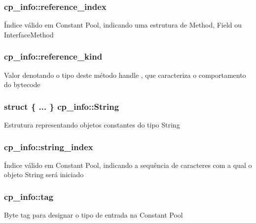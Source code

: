 \subsubsection[{\texorpdfstring{reference\+\_\+index}{reference_index}}]{ cp\+\_\+info\+::reference\+\_\+index}\hypertarget{structcp__info_a946bbab9aa280d4e22194ef7b434166a}{}\label{structcp__info_a946bbab9aa280d4e22194ef7b434166a}
Índice válido em Constant Pool, indicando uma estrutura de Method, Field ou Interface\+Method 
\subsubsection[{\texorpdfstring{reference\+\_\+kind}{reference_kind}}]{ cp\+\_\+info\+::reference\+\_\+kind}\hypertarget{structcp__info_a13e5aa07b7aa482061b89f4d7379a2dd}{}\label{structcp__info_a13e5aa07b7aa482061b89f4d7379a2dd}
Valor denotando o tipo deste método handle , que caracteriza o comportamento do bytecode 
\subsubsection[{\texorpdfstring{String}{String}}]{\setlength{\rightskip}{0pt plus 5cm}struct \{ ... \}   cp\+\_\+info\+::\+String}\hypertarget{structcp__info_a0b6107f2f01ff36a3d7d05175675b043}{}\label{structcp__info_a0b6107f2f01ff36a3d7d05175675b043}
Estrutura representando objetos constantes do tipo String 
\subsubsection[{\texorpdfstring{string\+\_\+index}{string_index}}]{ cp\+\_\+info\+::string\+\_\+index}\hypertarget{structcp__info_ae760e12a2ee01b0ace3d35170ca07981}{}\label{structcp__info_ae760e12a2ee01b0ace3d35170ca07981}
Índice válido em Constant Pool, indicando a sequência de caracteres com a qual o objeto String será iniciado 
\subsubsection[{\texorpdfstring{tag}{tag}}]{ cp\+\_\+info\+::tag}\hypertarget{structcp__info_a045b8801a6e96a2a31d3b62ea684f141}{}\label{structcp__info_a045b8801a6e96a2a31d3b62ea684f141}
Byte tag para designar o tipo de entrada na Constant Pool 
